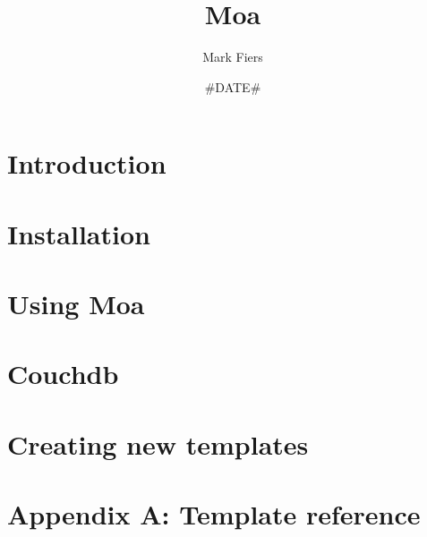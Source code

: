 \documentclass[a4paper,11pt,oneside]{report}
\begin{document}

\title{Moa}
\author{Mark Fiers}
\date{#DATE#}

\begin{titlepage}
\vfill
{}
\vfill
\vfill
{}
\end{titlepage}
\tableofcontents

\chapter{Introduction\label{ch:introduction}}

\chapter{Installation\label{ch:installation}}

\chapter{Using Moa\label{ch:using}}

\chapter{Couchdb\label{ch:couchdb}}

\chapter{Creating new templates\label{ch:newtemplates}}

\chapter{Appendix A: Template reference\label{ch:templateref}}



\end{document}
